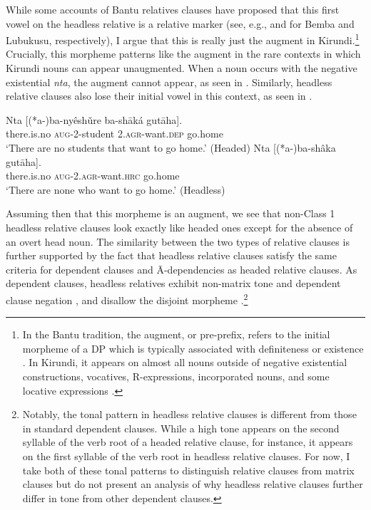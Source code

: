 \documentclass[output=paper,colorlinks,citecolor=brown
]{langscibook}
\begin{document}
While some accounts of Bantu relatives clauses have proposed that this first vowel on the headless relative is a relative marker (see, e.g., \citealt{Cheng:2006} and \citealt{Diercks:2010} for Bemba and Lubukusu, respectively), I argue that this is really just the augment in Kirundi.\footnote{In the Bantu tradition, the augment, or pre-prefix, refers to the initial morpheme of a DP which is typically associated with definiteness or existence \citep{Katamba:2003}. In Kirundi, it appears on almost all nouns outside of negative existential constructions, vocatives, R-expressions, incorporated nouns, and some locative expressions \citep{Ndayiragijeetal:2012}.}  Crucially, this morpheme patterns like the augment in the rare contexts in which Kirundi nouns can appear unaugmented. When a noun occurs with the negative existential \emph{nta}, the augment cannot appear, as seen in . Similarly, headless relative clauses also lose their initial vowel in this context, as seen in .

\ea 
\begin{xlist}

\ex \label{ex:myers:noaug} \gll Nta [(*a-)ba-nyêshǔre ba-shāká gutāha]. \\
there.is.no \textsc{aug}-2-student \textsc{2.agr}-want.\textsc{dep} go.home\\
\glt `There are no students that want to go home.' \hfill{(Headed)}
\ex \label{ex:myers:nta} \gll Nta [(*a-)ba-shâka gutāha].\label{ex:nored}\\
there.is.no  \textsc{aug}-\textsc{2.agr}-want.\textsc{hrc} go.home \\
\glt `There are none who want to go home.' \hfill{(Headless)}
\end{xlist}
\z

Assuming then that this morpheme is an augment, we see that non-Class 1 headless relative clauses look exactly like headed ones except for the absence of an overt head noun. The similarity between the two types of relative clauses is further supported by the fact that headless relative clauses satisfy the same criteria for dependent clauses and Ā-dependencies as headed relative clauses. As dependent clauses, headless relatives exhibit non-matrix tone  and dependent clause negation , and disallow the disjoint morpheme .\footnote{Notably, the tonal pattern in headless relative clauses is different from those in standard dependent clauses. While a high tone appears on the second syllable of the verb root of a headed relative clause, for instance, it appears on the first syllable of the verb root in headless relative clauses. For now, I take both of these tonal patterns to distinguish relative clauses from matrix clauses but do not present an analysis of why headless relative clauses further differ in tone from other dependent clauses.}
\end{document}
